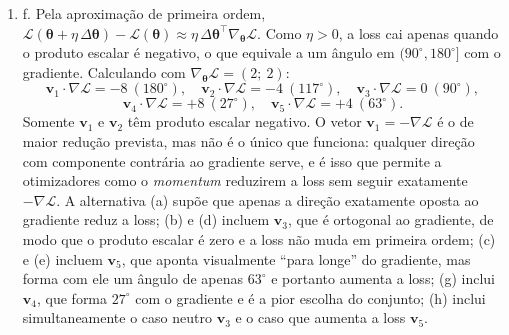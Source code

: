 \documentclass{dlproblemset}
\begin{document}
\begin{enumerate}[1)]
    \item f. Pela aproximação de primeira ordem, $\mathcal{L}(\boldsymbol{\theta} + \eta\,\Delta\boldsymbol{\theta}) - \mathcal{L}(\boldsymbol{\theta}) \approx \eta\,\Delta\boldsymbol{\theta}^{\top}\nabla_{\boldsymbol{\theta}}\mathcal{L}$. Como $\eta > 0$, a loss cai apenas quando o produto escalar é negativo, o que equivale a um ângulo em $(90^\circ, 180^\circ]$ com o gradiente. Calculando com $\nabla_{\boldsymbol{\theta}}\mathcal{L} = (2;\ 2)$:
    \[
    \mathbf{v}_1 \cdot \nabla\mathcal{L} = -8 \ (180^\circ), \quad
    \mathbf{v}_2 \cdot \nabla\mathcal{L} = -4 \ (117^\circ), \quad
    \mathbf{v}_3 \cdot \nabla\mathcal{L} = 0 \ (90^\circ),
    \]
    \[
    \mathbf{v}_4 \cdot \nabla\mathcal{L} = +8 \ (27^\circ), \quad
    \mathbf{v}_5 \cdot \nabla\mathcal{L} = +4 \ (63^\circ).
    \]
    Somente $\mathbf{v}_1$ e $\mathbf{v}_2$ têm produto escalar negativo. O vetor $\mathbf{v}_1 = -\nabla\mathcal{L}$ é o de maior redução prevista, mas não é o único que funciona: qualquer direção com componente contrária ao gradiente serve, e é isso que permite a otimizadores como o \textit{momentum} reduzirem a loss sem seguir exatamente $-\nabla\mathcal{L}$. A alternativa (a) supõe que apenas a direção exatamente oposta ao gradiente reduz a loss; (b) e (d) incluem $\mathbf{v}_3$, que é ortogonal ao gradiente, de modo que o produto escalar é zero e a loss não muda em primeira ordem; (c) e (e) incluem $\mathbf{v}_5$, que aponta visualmente ``para longe'' do gradiente, mas forma com ele um ângulo de apenas $63^\circ$ e portanto aumenta a loss; (g) inclui $\mathbf{v}_4$, que forma $27^\circ$ com o gradiente e é a pior escolha do conjunto; (h) inclui simultaneamente o caso neutro $\mathbf{v}_3$ e o caso que aumenta a loss $\mathbf{v}_5$.


\end{enumerate}
\end{document}
